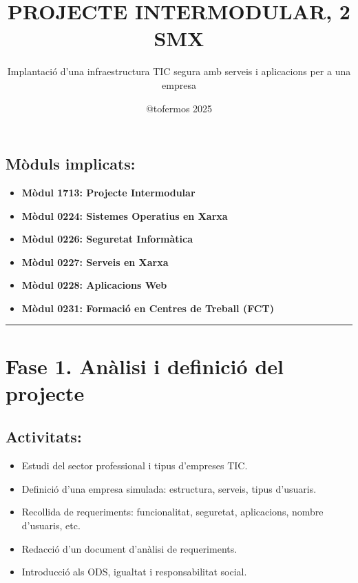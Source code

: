 \documentclass[
  a4paper,
]{article}
\title{PROJECTE INTERMODULAR, 2 SMX}
\subtitle{Implantació d'una infraestructura TIC segura amb serveis i
aplicacions per a una empresa}
\author{@tofermos 2025}
\date{}
\providecommand{\tightlist}{%
  \setlength{\itemsep}{0pt}\setlength{\parskip}{0pt}}
\begin{document}
\maketitle

{
\setcounter{tocdepth}{2}
\tableofcontents
}
\newpage
\renewcommand\tablename{Tabla}

\subsection{Mòduls implicats:}\label{muxf2duls-implicats}

\begin{itemize}
\tightlist
\item
  \textbf{Mòdul 1713: Projecte Intermodular}
\item
  \textbf{Mòdul 0224: Sistemes Operatius en Xarxa}
\item
  \textbf{Mòdul 0226: Seguretat Informàtica}
\item
  \textbf{Mòdul 0227: Serveis en Xarxa}
\item
  \textbf{Mòdul 0228: Aplicacions Web}
\item
  \textbf{Mòdul 0231: Formació en Centres de Treball (FCT)}
\end{itemize}

\begin{center}\rule{0.5\linewidth}{0.5pt}\end{center}

\section{Fase 1. Anàlisi i definició del
projecte}\label{fase-1.-anuxe0lisi-i-definiciuxf3-del-projecte}

\subsection{Activitats:}\label{activitats}

\begin{itemize}
\tightlist
\item
  Estudi del sector professional i tipus d'empreses TIC.
\item
  Definició d'una empresa simulada: estructura, serveis, tipus
  d'usuaris.
\item
  Recollida de requeriments: funcionalitat, seguretat, aplicacions,
  nombre d'usuaris, etc.
\item
  Redacció d'un document d'anàlisi de requeriments.
\item
  Introducció als ODS, igualtat i responsabilitat social.
\end{itemize}
\end{document}
